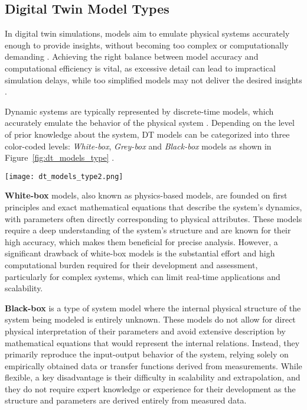 \subsection{Digital Twin Model Types}\label{subsec:ch2/sec2/sub1}

In digital twin simulations, models aim to emulate physical systems accurately enough to provide insights, without becoming too complex or computationally demanding \autocite{10666929, DIZ2023120606}. Achieving the right balance between model accuracy and computational efficiency is vital, as excessive detail can lead to impractical simulation delays, while too simplified models may not deliver the desired insights \autocite{10666932}.

Dynamic systems are typically represented by discrete-time models, which accurately emulate the behavior of the physical system \autocite{WANG2022124, DIZ2023120606}. Depending on the level of prior knowledge about the system, DT models can be categorized into three color-coded levels: \textit{White-box}, \textit{Grey-box} and \textit{Black-box} models as shown in Figure~\cref{fig:dt_models_type} \autocite{Vu2015}. 

\begin{figure*}[htbp]
    \centering
    \texttt{[image: dt\_models\_type2.png]}
    \caption{Block diagram of DT system modeling approaches.}
    \label{fig:dt_models_type}
\end{figure*}

\textbf{White-box} models, also known as physics-based models, are founded on first principles and exact mathematical equations that describe the system's dynamics, with parameters often directly corresponding to physical attributes. These models require a deep understanding of the system's structure and are known for their high accuracy, which makes them beneficial for precise analysis. However, a significant drawback of white-box models is the substantial effort and high computational burden required for their development and assessment, particularly for complex systems, which can limit real-time applications and scalability.

\textbf{Black-box} is a type of system model where the internal physical structure of the system being modeled is entirely unknown. These models do not allow for direct physical interpretation of their parameters and avoid extensive description by mathematical equations that would represent the internal relations. Instead, they primarily reproduce the input-output behavior of the system, relying solely on empirically obtained data or transfer functions derived from measurements. While flexible, a key disadvantage is their difficulty in scalability and extrapolation, and they do not require expert knowledge or experience for their development as the structure and parameters are derived entirely from measured data.

